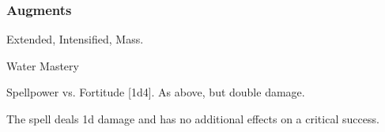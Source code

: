 \subsubsection{Augments}
 Extended, Intensified, Mass.
\begin{spellsection}{Water Mastery}
\begin{spellheader}
\end{spellheader}
\begin{spellcontent}
\begin{spelltargetinginfo}
\end{spelltargetinginfo}
\begin{spelleffects}
\begin{spellattack}{Spellpower vs. Fortitude}
\spellsuccess {}[1d4].
\spellcritical As above, but double damage.
\end{spellattack}
\end{spelleffects}
\end{spellcontent}
\begin{spellfooter}
\miscastexplode
\end{spellfooter}
\begin{spellcantrip}
The spell deals \minus1d damage and has no additional effects on a critical success.
\end{spellcantrip}
\end{spellsection}
